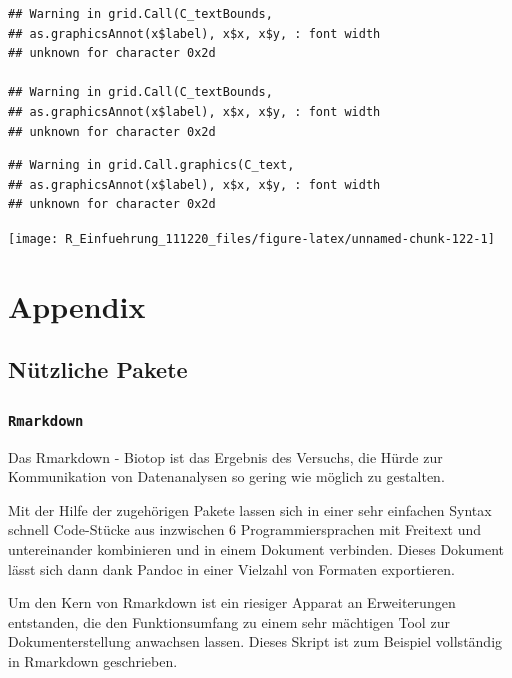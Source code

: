 \documentclass[
]{book}
\begin{document}
\begin{verbatim}
## Warning in grid.Call(C_textBounds,
## as.graphicsAnnot(x$label), x$x, x$y, : font width
## unknown for character 0x2d

## Warning in grid.Call(C_textBounds,
## as.graphicsAnnot(x$label), x$x, x$y, : font width
## unknown for character 0x2d
\end{verbatim}

\begin{verbatim}
## Warning in grid.Call.graphics(C_text,
## as.graphicsAnnot(x$label), x$x, x$y, : font width
## unknown for character 0x2d
\end{verbatim}

\begin{center}\texttt{[image: R\_Einfuehrung\_111220\_files/figure-latex/unnamed-chunk-122-1]} \end{center}

\hypertarget{appendix}{%
\chapter{Appendix}\label{appendix}}

\hypertarget{nuxfctzliche-pakete}{%
\section{Nützliche Pakete}\label{nuxfctzliche-pakete}}

\hypertarget{rmarkdown}{%
\subsection{\texorpdfstring{\texttt{Rmarkdown}}{Rmarkdown}}\label{rmarkdown}}

Das Rmarkdown - Biotop ist das Ergebnis des Versuchs, die Hürde zur Kommunikation von Datenanalysen so gering wie möglich zu gestalten.

Mit der Hilfe der zugehörigen Pakete lassen sich in einer sehr einfachen Syntax schnell Code-Stücke aus inzwischen 6 Programmiersprachen mit Freitext und untereinander kombinieren und in einem Dokument verbinden. Dieses Dokument lässt sich dann dank Pandoc in einer Vielzahl von Formaten exportieren.

Um den Kern von Rmarkdown ist ein riesiger Apparat an Erweiterungen entstanden, die den Funktionsumfang zu einem sehr mächtigen Tool zur Dokumenterstellung anwachsen lassen. Dieses Skript ist zum Beispiel vollständig in Rmarkdown geschrieben.
\end{document}
